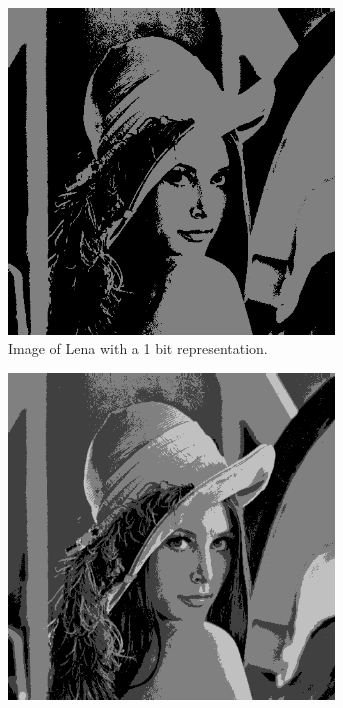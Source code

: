 \documentclass{article}
\theoremstyle{problemstyle}
\begin{document}
\begin{problem}
\begin{figure}[H]
	\begin{subfigure}{.45\textwidth}
		\centering
		\includegraphics[width=0.95\textwidth]{lena_b1.png}
		\caption{Image of Lena with a 1 bit representation.}
		\label{fig:lena_b1}
	\end{subfigure}
	\hfill
	\begin{subfigure}{.45\textwidth}
		\centering
		\includegraphics[width=0.95\textwidth]{lena_b2.png}

\end{subfigure}
\end{figure}
\end{problem}
\end{document}
